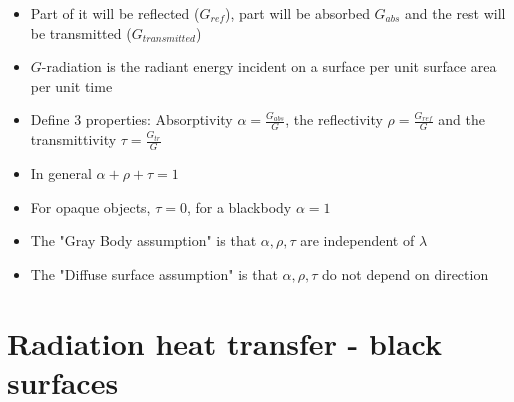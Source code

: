 \documentclass[12pt]{article}
\begin{document}
\begin{itemize}
\begin{itemize}
        \item Part of it will be reflected ($G_{ref}$), part will be absorbed $G_{abs}$ and the rest will be transmitted ($G_{transmitted}$)
        \item $G$-radiation is the radiant energy incident on a surface per unit surface area per unit time 
        \item Define 3 properties: Absorptivity $\alpha = \frac{G_{abs}}{G}$, the reflectivity $\rho = \frac{G_{ref}}{G}$ and the transmittivity $\tau = \frac{G_{tr}}{G}$
        \item In general $\alpha + \rho + \tau = 1$
        \item For opaque objects, $\tau = 0$, for a blackbody $\alpha = 1$
        \item The "Gray Body assumption" is that $\alpha, \rho, \tau$ are independent of $\lambda$
        \item The "Diffuse surface assumption" is that $\alpha, \rho, \tau$ do not depend on direction 
    \end{itemize}
    
\end{itemize}

\section{Radiation heat transfer - black surfaces} 
\end{document}
